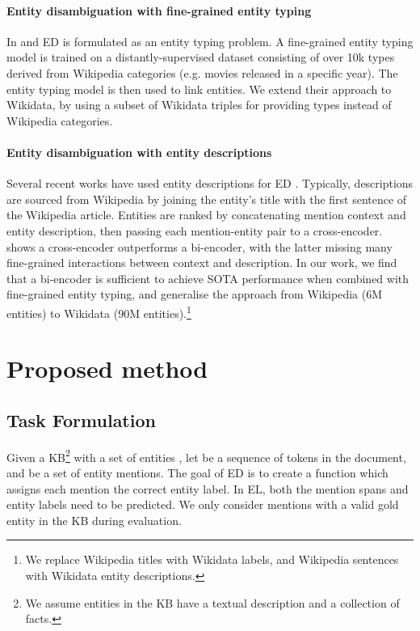 \documentclass[11pt]{article}
\begin{document}
\paragraph{Entity disambiguation with fine-grained entity typing}
In \citet{DBLP:conf/aaai/OnoeD20} and \citet{Raiman2018DeepTypeME} ED is formulated as an entity typing problem. A fine-grained entity typing model is trained on a distantly-supervised dataset consisting of over 10k types derived from Wikipedia categories (e.g. movies released in a specific year). The entity typing model is then used to link entities. We extend their approach to Wikidata, by using a subset of Wikidata triples for providing types instead of Wikipedia categories. 


\paragraph{Entity disambiguation with entity descriptions}
Several recent works have used entity descriptions for ED \citep{wu-etal-2020-scalable, logeswaran-etal-2019-zero}. Typically, descriptions are sourced from Wikipedia by joining the entity's title with the first sentence of the Wikipedia article. Entities are ranked by concatenating mention context and entity description, then passing each mention-entity pair to a cross-encoder. \citet{wu-etal-2020-scalable} shows a cross-encoder outperforms a bi-encoder, with the latter missing many fine-grained interactions between context and description. In our work, we find that a bi-encoder is sufficient to achieve SOTA performance when combined with fine-grained entity typing, and generalise the approach from Wikipedia (6M entities) to Wikidata (90M entities).\footnote{We replace Wikipedia titles with Wikidata labels, and Wikipedia sentences with Wikidata entity descriptions.}





\section{Proposed method}
\subsection{Task Formulation}
Given a KB\footnote{We assume entities in the KB have a textual description and a collection of facts.} with a set of entities , let  be a sequence of tokens in the document, and  be a set of entity mentions. The goal of ED is to create a function  which assigns each mention the correct entity label. In EL, both the mention spans and entity labels need to be predicted. We only consider mentions with a valid gold entity in the KB during evaluation.
\end{document}
